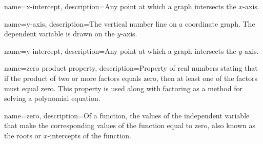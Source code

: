  {
	name=x-intercept,
	description={Any point at which a graph intersects the $x$-axis.}
}

 {
	name=y-axis,
	description={The vertical number line on a coordinate graph. The dependent variable is drawn on the $y$-axis.}
}

 {
	name=y-intercept,
	description={Any point at which a graph intersects the $y$-axis.}
}

 {
	name=zero product property,
	description={Property of real numbers stating that if the product of two or more factors equals zero, then at least one of the factors must equal zero. This property is used along with factoring as a method for solving a polynomial equation.}
}

 {
	name=zero,
	description={Of a function, the values of the independent variable that make the corresponding values of the function equal to zero, also known as the \glspl{root} or $x$-intercepts of the function.}
}
